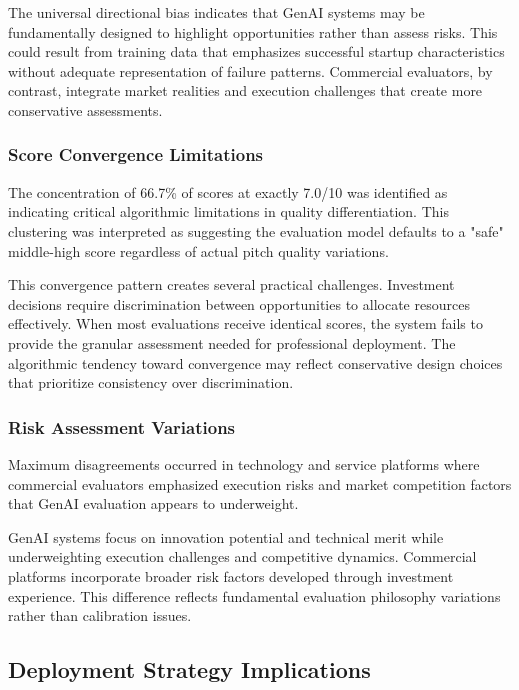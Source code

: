 The universal directional bias indicates that GenAI systems may be fundamentally designed to highlight opportunities rather than assess risks. This could result from training data that emphasizes successful startup characteristics without adequate representation of failure patterns. Commercial evaluators, by contrast, integrate market realities and execution challenges that create more conservative assessments.

\subsubsection{Score Convergence Limitations}
\label{subsec:convergence}

The concentration of 66.7\% of scores at exactly 7.0/10 was identified as indicating critical algorithmic limitations in quality differentiation. This clustering was interpreted as suggesting the evaluation model defaults to a "safe" middle-high score regardless of actual pitch quality variations.

This convergence pattern creates several practical challenges. Investment decisions require discrimination between opportunities to allocate resources effectively. When most evaluations receive identical scores, the system fails to provide the granular assessment needed for professional deployment. The algorithmic tendency toward convergence may reflect conservative design choices that prioritize consistency over discrimination.

\subsubsection{Risk Assessment Variations}
\label{subsec:risk}

Maximum disagreements occurred in technology and service platforms where commercial evaluators emphasized execution risks and market competition factors that GenAI evaluation appears to underweight.

GenAI systems focus on innovation potential and technical merit while underweighting execution challenges and competitive dynamics. Commercial platforms incorporate broader risk factors developed through investment experience. This difference reflects fundamental evaluation philosophy variations rather than calibration issues.

\subsection{Deployment Strategy Implications}
\label{sec:deployment}

